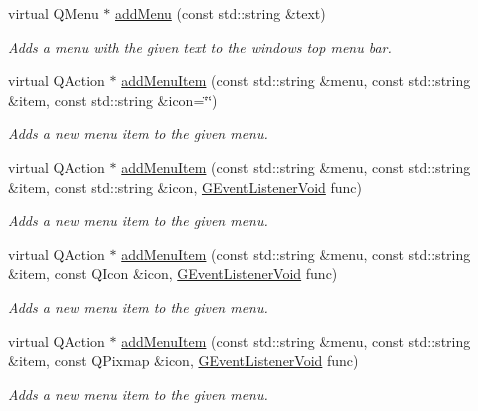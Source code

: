 \begin{DoxyCompactItemize}
virtual Q\+Menu $\ast$ \mbox{\hyperlink{classsgl_1_1GWindow_afffea482963d5566e97ccccb1f94a4e2}{add\+Menu}} (const std\+::string \&text)
\begin{DoxyCompactList}\small\item\em Adds a menu with the given text to the window\textquotesingle{}s top menu bar. \end{DoxyCompactList}\item 
virtual Q\+Action $\ast$ \mbox{\hyperlink{classsgl_1_1GWindow_a43efd24277d68e749443cb7c36b65f4b}{add\+Menu\+Item}} (const std\+::string \&menu, const std\+::string \&item, const std\+::string \&icon=\char`\"{}\char`\"{})
\begin{DoxyCompactList}\small\item\em Adds a new menu item to the given menu. \end{DoxyCompactList}\item 
virtual Q\+Action $\ast$ \mbox{\hyperlink{classsgl_1_1GWindow_ad57e2955efbfb5a0cccc981332945c8e}{add\+Menu\+Item}} (const std\+::string \&menu, const std\+::string \&item, const std\+::string \&icon, \mbox{\hyperlink{namespacesgl_a54427ce97bb1c2804e4fe2b0a62e8b17}{G\+Event\+Listener\+Void}} func)
\begin{DoxyCompactList}\small\item\em Adds a new menu item to the given menu. \end{DoxyCompactList}\item 
virtual Q\+Action $\ast$ \mbox{\hyperlink{classsgl_1_1GWindow_a9c1d62659ac23b6752a59dc657c5140c}{add\+Menu\+Item}} (const std\+::string \&menu, const std\+::string \&item, const Q\+Icon \&icon, \mbox{\hyperlink{namespacesgl_a54427ce97bb1c2804e4fe2b0a62e8b17}{G\+Event\+Listener\+Void}} func)
\begin{DoxyCompactList}\small\item\em Adds a new menu item to the given menu. \end{DoxyCompactList}\item 
virtual Q\+Action $\ast$ \mbox{\hyperlink{classsgl_1_1GWindow_a8452af11e9c36ac44dbdc4332095871e}{add\+Menu\+Item}} (const std\+::string \&menu, const std\+::string \&item, const Q\+Pixmap \&icon, \mbox{\hyperlink{namespacesgl_a54427ce97bb1c2804e4fe2b0a62e8b17}{G\+Event\+Listener\+Void}} func)
\begin{DoxyCompactList}\small\item\em Adds a new menu item to the given menu. \end{DoxyCompactList}\item 

\end{DoxyCompactItemize}
